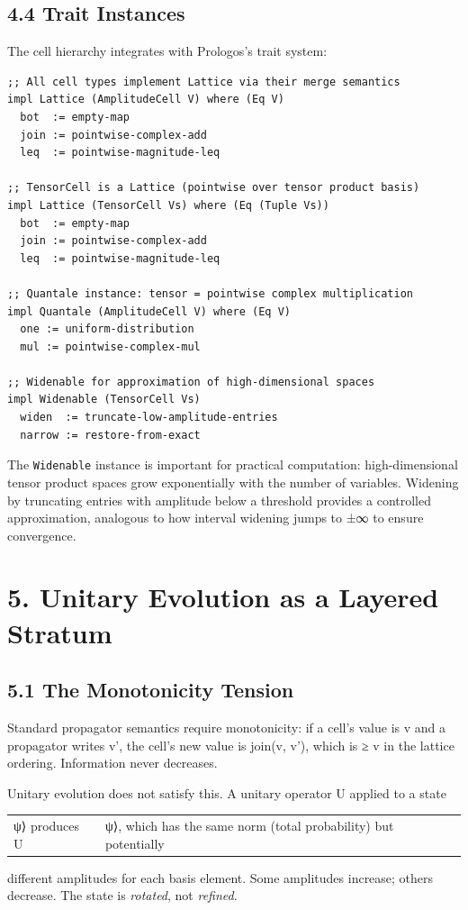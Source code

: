 \documentclass[11pt]{article}
\begin{document}
\subsection{4.4 Trait Instances}
\label{sec:org0e2de2e}

The cell hierarchy integrates with Prologos's trait system:

\begin{verbatim}
;; All cell types implement Lattice via their merge semantics
impl Lattice (AmplitudeCell V) where (Eq V)
  bot  := empty-map
  join := pointwise-complex-add
  leq  := pointwise-magnitude-leq

;; TensorCell is a Lattice (pointwise over tensor product basis)
impl Lattice (TensorCell Vs) where (Eq (Tuple Vs))
  bot  := empty-map
  join := pointwise-complex-add
  leq  := pointwise-magnitude-leq

;; Quantale instance: tensor = pointwise complex multiplication
impl Quantale (AmplitudeCell V) where (Eq V)
  one := uniform-distribution
  mul := pointwise-complex-mul

;; Widenable for approximation of high-dimensional spaces
impl Widenable (TensorCell Vs)
  widen  := truncate-low-amplitude-entries
  narrow := restore-from-exact
\end{verbatim}

The \texttt{Widenable} instance is important for practical computation: high-dimensional
tensor product spaces grow exponentially with the number of variables. Widening
by truncating entries with amplitude below a threshold provides a controlled
approximation, analogous to how interval widening jumps to ±∞ to ensure
convergence.
\section{5. Unitary Evolution as a Layered Stratum}
\label{sec:orgfe1e6a8}

\subsection{5.1 The Monotonicity Tension}
\label{sec:org0fe4926}

Standard propagator semantics require monotonicity: if a cell's value is v and
a propagator writes v', the cell's new value is join(v, v'), which is ≥ v in
the lattice ordering. Information never decreases.

Unitary evolution does not satisfy this. A unitary operator U applied to a state
\begin{center}
\begin{tabular}{ll}
ψ⟩ produces U & ψ⟩, which has the same norm (total probability) but potentially\\
\end{tabular}
\end{center}
different amplitudes for each basis element. Some amplitudes increase; others
decrease. The state is \emph{rotated}, not \emph{refined}.
\end{document}
